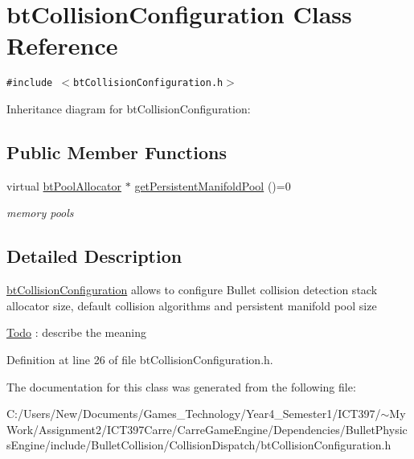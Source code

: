 \hypertarget{classbt_collision_configuration}{
\section{btCollisionConfiguration Class Reference}
\label{classbt_collision_configuration}
}
{\tt \#include $<$btCollisionConfiguration.h$>$}

Inheritance diagram for btCollisionConfiguration:\subsection*{Public Member Functions}
\begin{CompactItemize}
\item 
\hypertarget{classbt_collision_configuration_0885a7c5ff597994cade5b1a495edfa2}{
virtual \hyperlink{classbt_pool_allocator}{btPoolAllocator} $\ast$ \hyperlink{classbt_collision_configuration_0885a7c5ff597994cade5b1a495edfa2}{getPersistentManifoldPool} ()=0}
\label{classbt_collision_configuration_0885a7c5ff597994cade5b1a495edfa2}

\begin{CompactList}\small\item\em memory pools \item\end{CompactList}\end{CompactItemize}


\subsection{Detailed Description}
\hyperlink{classbt_collision_configuration}{btCollisionConfiguration} allows to configure Bullet collision detection stack allocator size, default collision algorithms and persistent manifold pool size \begin{Desc}
\item[\hyperlink{todo__todo000010}{Todo}]: describe the meaning \end{Desc}


Definition at line 26 of file btCollisionConfiguration.h.

The documentation for this class was generated from the following file:\begin{CompactItemize}
\item 
C:/Users/New/Documents/Games\_\-Technology/Year4\_\-Semester1/ICT397/$\sim$My Work/Assignment2/ICT397Carre/CarreGameEngine/Dependencies/BulletPhysicsEngine/include/BulletCollision/CollisionDispatch/btCollisionConfiguration.h\end{CompactItemize}
